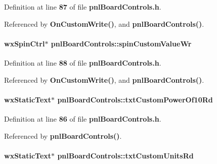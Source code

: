 Definition at line {\bf 87} of file {\bf pnl\+Board\+Controls.\+h}.



Referenced by {\bf On\+Custom\+Write()}, and {\bf pnl\+Board\+Controls()}.

\paragraph[{spin\+Custom\+Value\+Wr}]{\setlength{\rightskip}{0pt plus 5cm}wx\+Spin\+Ctrl$\ast$ pnl\+Board\+Controls\+::spin\+Custom\+Value\+Wr\hspace{0.3cm}{\ttfamily [protected]}}\label{classpnlBoardControls_a57117cea44400665933d6e981ddab324}


Definition at line {\bf 88} of file {\bf pnl\+Board\+Controls.\+h}.



Referenced by {\bf On\+Custom\+Write()}, and {\bf pnl\+Board\+Controls()}.

\paragraph[{txt\+Custom\+Power\+Of10\+Rd}]{\setlength{\rightskip}{0pt plus 5cm}wx\+Static\+Text$\ast$ pnl\+Board\+Controls\+::txt\+Custom\+Power\+Of10\+Rd\hspace{0.3cm}{\ttfamily [protected]}}\label{classpnlBoardControls_ab81ef2e370968a2ee796a94e5c7c4849}


Definition at line {\bf 86} of file {\bf pnl\+Board\+Controls.\+h}.



Referenced by {\bf pnl\+Board\+Controls()}.

\paragraph[{txt\+Custom\+Units\+Rd}]{\setlength{\rightskip}{0pt plus 5cm}wx\+Static\+Text$\ast$ pnl\+Board\+Controls\+::txt\+Custom\+Units\+Rd\hspace{0.3cm}{\ttfamily [protected]}}\label{classpnlBoardControls_ad80673416b21172fd9829b5fb17f975c}


